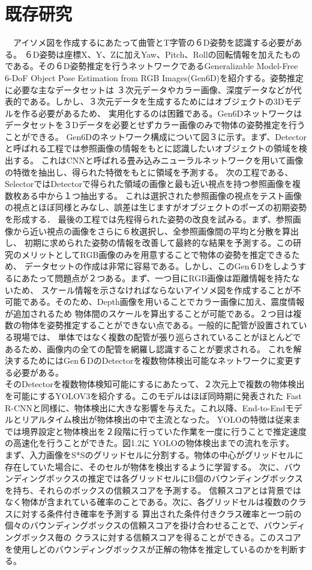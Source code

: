 \section{既存研究}
　アイソメ図を作成するにあたって曲管とT字管の６D姿勢を認識する必要がある。
６D姿勢は座標X、Y、Zに加えYaw、Pitch、Rollの回転情報を加えたものである。その６D姿勢推定を行うネットワークであるGeneralizable 
Model-Free 6-DoF Object Pose Estimation from RGB Images(Gen6D)を紹介する。姿勢推定に必要な主なデータセットは
３次元データやカラー画像、深度データなどが代表的である。しかし、３次元データを生成するためにはオブジェクトの3Dモデルを作る必要があるため、
実用化するのは困難である。Gen6Dネットワークはデータセットを３Dデータを必要とせずカラー画像のみで物体の姿勢推定を行うことができる。
Gen6Dのネットワーク構成について図３に示す。まず、Detectorと呼ばれる工程では参照画像の情報をもとに認識したいオブジェクトの領域を検出する。
これはCNNと呼ばれる畳み込みニューラルネットワークを用いて画像の特徴を抽出し、得られた特徴をもとに領域を予測する。
次の工程である、SelectorではDetectorで得られた領域の画像と最も近い視点を持つ参照画像を複数枚ある中から１つ抽出する。
これは選択された参照画像の視点をテスト画像の視点とほぼ同様とみなし、誤差は生じますがオブジェクトのポーズの初期姿勢を形成する．
最後の工程では先程得られた姿勢の改良を試みる。まず、参照画像から近い視点の画像をさらに６枚選択し、全参照画像間の平均と分散を算出し、
初期に求められた姿勢の情報を改善して最終的な結果を予測する。この研究のメリットとしてRGB画像のみを用意することで物体の姿勢を推定できるため、
データセットの作成は非常に容易である。しかし、このGen６Dをしようするにあたって問題点が２つある。まず、一つ目にRGB画像は距離情報を持たないため、
スケール情報を示さなければならないアイソメ図を作成することが不可能である。そのため、Depth画像を用いることでカラー画像に加え、震度情報が追加されるため
物体間のスケールを算出することが可能である。２つ目は複数の物体を姿勢推定することができない点である。一般的に配管が設置されている現場では、
単体ではなく複数の配管が張り巡らされていることがほとんどであるため、画像内の全ての配管を網羅し認識することが要求される。
これを解決するためにはGen６DのDetectorを複数物体検出可能なネットワークに変更する必要がある。\\
 そのDetectorを複数物体検知可能にするにあたって、２次元上で複数の物体検出を可能にするYOLOV3を紹介する。このモデルはほぼ同時期に発表された
 Fast R-CNNと同様に、物体検出に大きな影響を与えた。これ以降、End-to-Endモデルとリアルタイム検出が物体検出の中で主流となった。
YOLOの特徴は従来までは境界設定と物体検出を２段階に行っていた作業を一度に行うことで推定速度の高速化を行うことができた。図1.2に
YOLOの物体検出までの流れを示す。\\
まず、入力画像をS*Sのグリッドセルに分割する。物体の中心がグリッドセルに存在していた場合に、そのセルが物体を検出するように学習する。
次に、バウンディングボックスの推定では各グリッドセルにB個のバウンディングボックスを持ち、それらのボックスの信頼スコアを予測する。
信頼スコアとは背景ではなく物体が含まれている確率のことである。次に、各グリッドセルは複数のクラスに対する条件付き確率を予測する
算出された条件付きクラス確率と一つ前の個々のバウンディングボックスの信頼スコアを掛け合わせることで、バウンディングボックス毎の
クラスに対する信頼スコアを得ることができる。このスコアを使用しどのバウンディングボックスが正解の物体を推定しているのかを判断する。

